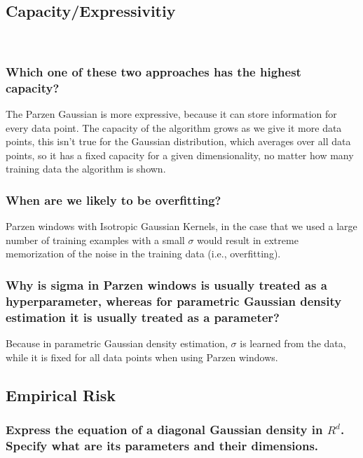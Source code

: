 \documentclass{amsart}
\theoremstyle{definition}
\theoremstyle{remark}
\numberwithin{equation}{section}
\begin{document}
\subsection{Capacity/Expressivitiy} \\
\subsubsection{Which one of these two approaches has the highest capacity?} 

The Parzen Gaussian is more expressive, because it can store information for
every data point. The capacity of the algorithm grows as we give it more data 
points, this isn't true for the Gaussian distribution, which averages over all 
data points, so it has a fixed capacity for a given dimensionality, no matter 
how many training data the algorithm is shown. \\

\subsubsection{When are we likely to be overfitting?} 

Parzen windows with Isotropic Gaussian Kernels, in the case that we used a 
large number of training examples with a small $\sigma$ would result in extreme 
memorization of the noise in the training data (i.e., overfitting). \\

\subsubsection{Why is sigma in Parzen windows is usually treated as a 
hyperparameter,  whereas for parametric Gaussian density estimation it is 
usually treated as a parameter?} 

Because in parametric Gaussian density estimation, $\sigma$ is learned from 
the data, while it is fixed for all data points when using Parzen windows. \\ 

\subsection{Empirical Risk}

\subsubsection{Express the equation of a diagonal Gaussian density in $R^d$. 
Specify what are its parameters and their dimensions.} \\
\end{document}

